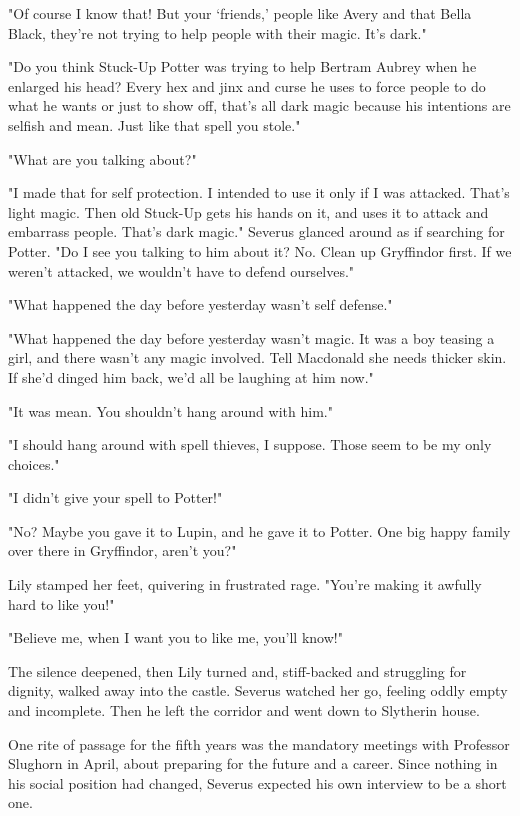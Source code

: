 "Of course I know that! But your `friends,' people like Avery and that Bella Black, they're not trying to help people with their magic. It's dark."

"Do you think Stuck-Up Potter was trying to help Bertram Aubrey when he enlarged his head? Every hex and jinx and curse he uses to force people to do what he wants or just to show off, that's all dark magic because his intentions are selfish and mean. Just like that spell you stole."

"What are you talking about?"

"I made that for self protection. I intended to use it only if I was attacked. That's light magic. Then old Stuck-Up gets his hands on it, and uses it to attack and embarrass people. That's dark magic." Severus glanced around as if searching for Potter. "Do I see you talking to him about it? No. Clean up Gryffindor first. If we weren't attacked, we wouldn't have to defend ourselves."

"What happened the day before yesterday wasn't self defense."

"What happened the day before yesterday wasn't magic. It was a boy teasing a girl, and there wasn't any magic involved. Tell Macdonald she needs thicker skin. If she'd dinged him back, we'd all be laughing at him now."

"It was mean. You shouldn't hang around with him."

"I should hang around with spell thieves, I suppose. Those seem to be my only choices."

"I didn't give your spell to Potter!"

"No? Maybe you gave it to Lupin, and he gave it to Potter. One big happy family over there in Gryffindor, aren't you?"

Lily stamped her feet, quivering in frustrated rage. "You're making it awfully hard to like you!"

"Believe me, when I want you to like me, you'll know!"

The silence deepened, then Lily turned and, stiff-backed and struggling for dignity, walked away into the castle. Severus watched her go, feeling oddly empty and incomplete. Then he left the corridor and went down to Slytherin house.

One rite of passage for the fifth years was the mandatory meetings with Professor Slughorn in April, about preparing for the future and a career. Since nothing in his social position had changed, Severus expected his own interview to be a short one.

